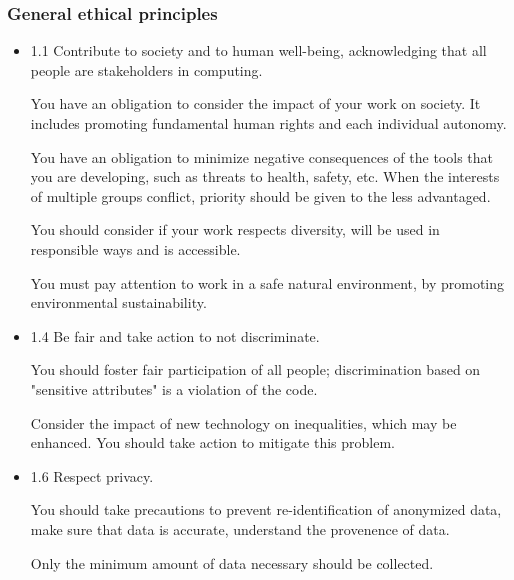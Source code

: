 \subsubsection{General ethical principles}
\begin{itemize}
    \item 1.1 Contribute to society and to human well-being, acknowledging that all people are stakeholders in computing. 
    
    You have an obligation to consider the impact of your work on society. It includes promoting fundamental human rights and each individual autonomy. 
    
    You have an obligation to minimize negative consequences of the tools that you are developing, such as threats to health, safety, etc.
    When the interests of multiple groups conflict, priority should be given to the less advantaged. 
    
    You should consider if your work respects diversity, will be used in responsible ways and is accessible.
    
    You must pay attention to work in a safe natural environment, by promoting environmental sustainability.
    \item 1.4 Be fair and take action to not discriminate. 
    
    You should foster fair participation of all people; discrimination based on "sensitive attributes" is a violation of the code.
    
    Consider the impact of new technology on inequalities, which may be enhanced. You should take action to mitigate this problem.
    \item 1.6 Respect privacy. 
    
    You should take precautions to prevent re-identification of anonymized data, make sure that data is accurate, understand the provenence of data.
    
    Only the minimum amount of data necessary should be collected.
\end{itemize}
